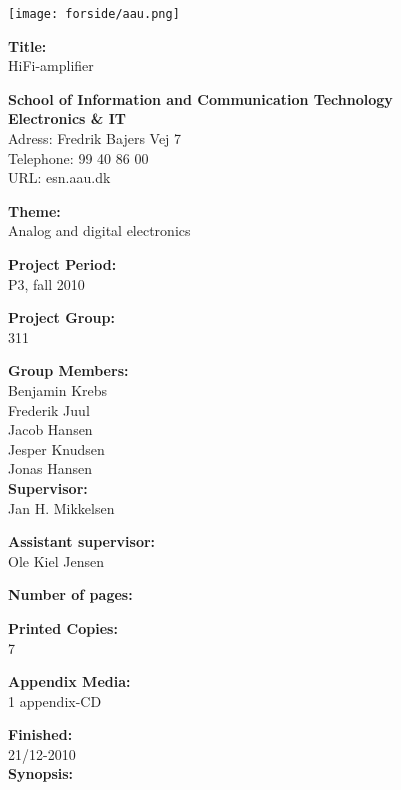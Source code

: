 \begin{multicols}{2}
\texttt{[image: forside/aau.png]}

\small{\textbf{Title:\\}
HiFi-amplifier}

\scriptsize{\textbf{School of Information and Communication Technology\\ Electronics \& IT\\}
Adress: Fredrik Bajers Vej 7\\
Telephone: 99 40 86 00\\
URL: esn.aau.dk \\}
\end{multicols}
\begin{multicols}{2}

\small{\textbf{Theme:\\}
Analog and digital electronics

\textbf{Project Period:\\}
P3, fall 2010

\textbf{Project Group:\\}
311

\textbf{Group Members:\\}
Benjamin Krebs\\
Frederik Juul\\
Jacob Hansen\\
Jesper Knudsen\\
Jonas Hansen\\

\textbf{Supervisor:\\}
Jan H. Mikkelsen

\textbf{Assistant supervisor:\\}
Ole Kiel Jensen

\textbf{Number of pages:\\}
\pageref{LastPage}

\textbf{Printed Copies:\\}
7

\textbf{Appendix Media:\\}
1 appendix-CD

\textbf{Finished:\\}
21/12-2010
\\
\textbf{Synopsis:}}

\end{multicols}
